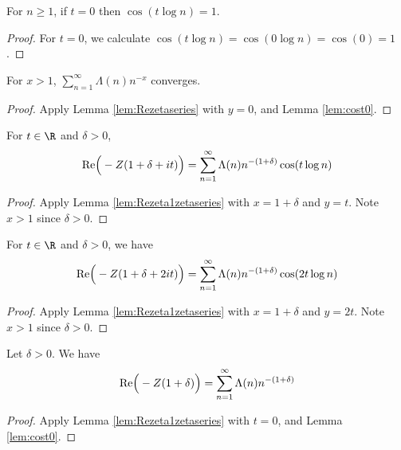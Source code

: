 \begin{lemma}\label{lem:cost0}  \leanok
For $n\ge1$, if $t=0$ then $\cos(t\log n)=1$.
\end{lemma}
\begin{proof} \leanok
For $t=0$, we calculate $\cos(t\log n)  = \cos(0\log n) = \cos(0)=1$.
\end{proof}

\begin{lemma} \label{lem:Rezetaseries0}  \leanok
For $x>1$, $\sum_{n=1}^{\infty} \Lambda(n) n^{-x}$ converges.
\end{lemma}
\begin{proof} \leanok {}
Apply Lemma \ref{lem:Rezetaseries} with $y=0$,  and Lemma \ref{lem:cost0}.
\end{proof}

\begin{lemma} \label{lem:Rezeta1zetaseries1}  \leanok
For $t\in\R$ and $\delta>0$,
\begin{align*}
{\rm Re}\Big(-Z(1+\delta+it)\Big) = \sum_{n=1}^{\infty} \Lambda(n) n^{-(1+\delta)}\cos(t\log n)
\end{align*}
\end{lemma}
\begin{proof} \leanok {}
Apply Lemma \ref{lem:Rezeta1zetaseries} with $x=1+\delta$ and $y=t$. Note $x>1$ since $\delta>0$.
\end{proof}

\begin{lemma} \label{lem:Rezeta1zetaseries2}  \leanok
For $t\in\R$ and $\delta>0$, we have
\begin{align*}
{\rm Re}\Big(-Z(1+\delta+2it)\Big) = \sum_{n=1}^{\infty} \Lambda(n) n^{-(1+\delta)}\cos(2t\log n)
\end{align*}
\end{lemma}
\begin{proof} \leanok {}
Apply Lemma \ref{lem:Rezeta1zetaseries} with $x=1+\delta$ and $y=2t$. Note $x>1$ since $\delta>0$.
\end{proof}



\begin{lemma} \label{lem:Rezeta1zetaseries0}  \leanok
Let $\delta>0$. We have
\begin{align*}
{\rm Re}\Big(-Z(1+\delta)\Big) = \sum_{n=1}^{\infty} \Lambda(n) n^{-(1+\delta)}
\end{align*}
\end{lemma}
\begin{proof} \leanok {}
Apply Lemma \ref{lem:Rezeta1zetaseries} with $t=0$, and Lemma \ref{lem:cost0}.
\end{proof}


